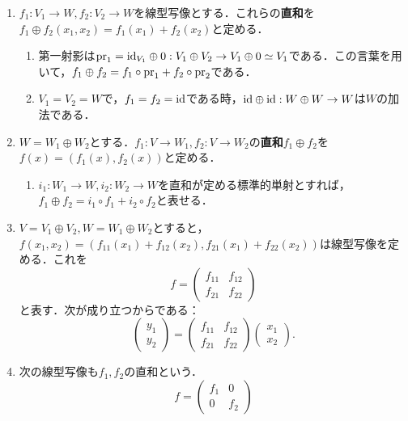 \documentclass[uplatex, 12pt, dvipdfmx]{jsreport}
\begin{document}
\begin{definition}[線型写像の直和]\mbox{}
    \begin{enumerate}
        \item $f_1:V_1\to W,f_2:V_2\to W$を線型写像とする．これらの\textbf{直和}を$f_1\oplus f_2(x_1,x_2)=f_1(x_1)+f_2(x_2)$と定める．
        \begin{enumerate}[(1)]
            \item 第一射影は$\mathrm{pr}_1=\mathrm{id}_{V_1}\oplus 0:V_1\oplus V_2\to V_1\oplus 0\simeq V_1$である．この言葉を用いて，$f_1\oplus f_2=f_1\circ\mathrm{pr}_1+f_2\circ\mathrm{pr}_2$である．
            \item $V_1=V_2=W$で，$f_1=f_2=\mathrm{id}$である時，$\mathrm{id}\oplus\mathrm{id}:W\oplus W\to W$は$W$の加法である．
        \end{enumerate}
        \item $W=W_1\oplus W_2$とする．$f_1:V\to W_1,f_2:V\to W_2$の\textbf{直和}$f_1\oplus f_2$を$f(x)=(f_1(x),f_2(x))$と定める．
        \begin{enumerate}[(1)]
            \item $i_1:W_1\to W,i_2:W_2\to W$を直和が定める標準的単射とすれば，$f_1\oplus f_2=i_1\circ f_1+i_2\circ f_2$と表せる．
        \end{enumerate}
        \item $V=V_1\oplus V_2,W=W_1\oplus W_2$とすると，$f(x_1,x_2)=(f_{11}(x_1)+f_{12}(x_2),f_{21}(x_1)+f_{22}(x_2))$は線型写像を定める．これを
        \[ f=\begin{pmatrix}f_{11}&f_{12}\\f_{21}&f_{22}\end{pmatrix} \]
        と表す．次が成り立つからである：
        \[ \begin{pmatrix}y_1\\y_2\end{pmatrix}=\begin{pmatrix}f_{11}&f_{12}\\f_{21}&f_{22}\end{pmatrix}\begin{pmatrix}x_1\\x_2\end{pmatrix}. \]
        \item 次の線型写像も$f_1,f_2$の直和という．
        \[ f=\begin{pmatrix}f_{1}&0\\0&f_{2}\end{pmatrix} \]
    \end{enumerate}
\end{definition}
\end{document}
